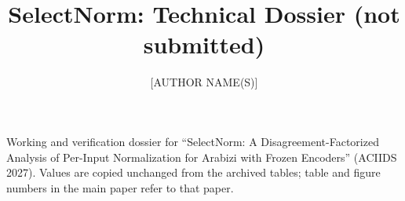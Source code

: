 \documentclass[runningheads]{llncs}
\begin{document}
\title{SelectNorm: Technical Dossier (not submitted)}
\author{[AUTHOR NAME(S)]}\institute{[AFFILIATION]}
\maketitle
\noindent Working and verification dossier for ``SelectNorm: A Disagreement-Factorized Analysis of Per-Input Normalization for Arabizi with Frozen Encoders'' (ACIIDS 2027). Values are copied unchanged from the archived tables; table and figure numbers in the main paper refer to that paper.

\begin{table}[!htb]\centering\scriptsize\setlength{\tabcolsep}{3pt}
\caption{Paired differences in macro-F1 (SelectNorm-adapt minus baseline, $\lambda=0$, seed-averaged) with 95\% paired-bootstrap intervals (10{,}000 resamples of test sentences). $^{*}$: Holm-corrected $p<0.05$ over the protocol's 20 comparisons per encoder. $^{\dagger}$: the interval lies inside $(-1,+1)$, the protocol's relevance margin; reading this as equivalence is post hoc and not corrected for multiplicity. Intervals without either mark are inconclusive about both difference and equivalence.}
\resizebox{\textwidth}{!}{}\end{table}

\begin{table}[!htb]\centering\scriptsize\setlength{\tabcolsep}{3.5pt}
\caption{As Table~2 of the paper, with $f$ also trained on synthetic Latin renderings (\textsc{+syn}, exploratory regime).}
\resizebox{\textwidth}{!}{}\end{table}

\begin{table}[!htb]\centering\footnotesize\setlength{\tabcolsep}{3pt}
\caption{Routing behaviour (mE5, $\lambda=0$): selection rate, harmful transformations per 100 inputs, share of oracle opportunities captured, and estimated cost relative to B0. Help/harm: number of inputs where normalisation corrects/introduces an error.}
\resizebox{\textwidth}{!}{}\end{table}

\begin{table}[!htb]\centering\scriptsize\setlength{\tabcolsep}{4pt}
\caption{95\% intervals for the mechanism measurements of Table~3 of the paper (1{,}000 bootstrap resamples of test sentences, seed-averaged within each resample; estimators not refitted).}
\resizebox{\textwidth}{!}{}\end{table}
\end{document}
